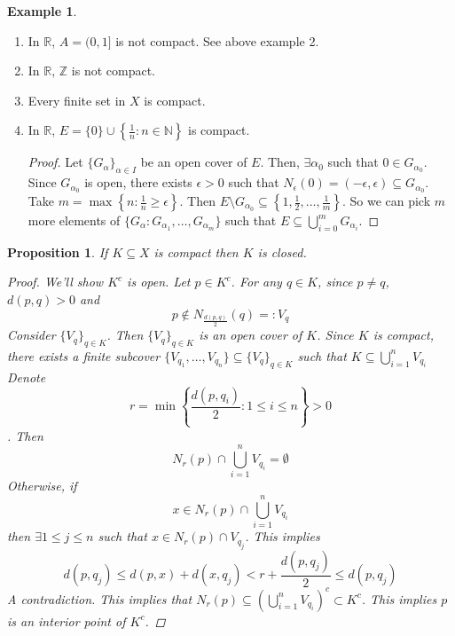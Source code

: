 \documentclass[10pt]{article}
\newtheorem{proposition}[theorem]{Proposition}
\theoremstyle{definition}
\newtheorem{example}[theorem]{Example}
\theoremstyle{remark}
\begin{document}
\begin{example}
    \hfill
    \begin{enumerate}
        \item In $\mathbb{R}$, $A = (0, 1]$ is not compact. See above example 2.
        \item In $\mathbb{R}$, $\mathbb{Z}$ is not compact.
        \item Every finite set in $X$ is compact.
        \item In $\mathbb{R}$, $E = \{0\} \cup \left\{\frac{1}{n} \colon n \in \mathbb{N}\right\}$ is compact.
            \begin{proof}
                Let $\{G_\alpha\}_{\alpha \in I}$ be an open cover of $E$.
                Then, $\exists \alpha_0$ such that $0 \in G_{\alpha_0}$.
                Since $G_{\alpha_0}$ is open, there exists $\epsilon >0$ such that $N_\epsilon(0) = (-\epsilon, \epsilon) \subseteq G_{\alpha_0}$.
                Take $m = \max\left\{n \colon \frac{1}{n} \geq \epsilon\right\}$.
                Then $E \setminus G_{\alpha_0} \subseteq \left\{1, \frac{1}{2}, \ldots, \frac{1}{m}\right\}$.
                So we can pick $m$ more elements of $\{G_\alpha \colon G_{\alpha_1}, \ldots, G_{\alpha_m}\}$ such that
                $E \subseteq \bigcup_{i=0}^m G_{\alpha_i}$.
            \end{proof}
    \end{enumerate}
\end{example}

\begin{proposition}
    If $K \subseteq X$ is compact then $K$ is closed.
    \begin{proof}
        We'll show $K^c$ is open. Let $p \in K^c$. For any $q \in K$, since $p \neq q$, $d(p, q) > 0$ and 
        $$p \not\in N_{\frac{d(p,q)}{2}}(q) =: V_q$$
        Consider $\{V_q\}_{q \in K}$. Then $\{V_q\}_{q \in K}$ is an open cover of $K$.
        Since $K$ is compact, there exists a finite subcover
        $\{V_{q_1}, \ldots, V_{q_n}\} \subseteq \{V_q\}_{q \in K}$ such that $K \subseteq \bigcup_{i=1}^n V_{q_i}$
        Denote $$r = \min\left\{\frac{d(p, q_i)}{2} \colon 1 \leq i \leq n\right\} > 0$$.
        Then
        $$N_r(p) \cap \bigcup_{i=1}^n V_{q_i} = \emptyset$$
        Otherwise, if
        $$x \in  N_r(p) \cap \bigcup_{i=1}^n V_{q_i}$$
        then $\exists 1 \leq j \leq n$ such that $x \in N_r(p) \cap V_{q_j}$. This implies
        $$d(p, q_j) \leq d(p, x) + d(x, q_j) < r + \frac{d(p, q_j)}{2} \leq d(p, q_j)$$
        A contradiction. This implies that $N_r(p) \subseteq \left(\bigcup_{i=1}^n V_{q_i}\right)^c \subset K^c$. This implies $p$ is an interior point of $K^c$.
    \end{proof}
\end{proposition}
\end{document}
